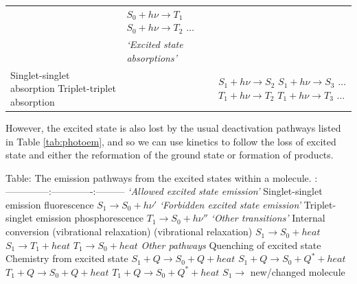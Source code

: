 \documentclass[
]{book}
\begin{document}
\begin{longtable}[]{@{}lll@{}}
\begin{minipage}[t]{0.33\columnwidth}
\strut
\end{minipage} & \begin{minipage}[t]{0.23\columnwidth}\raggedright
\(S_0 + h \nu \longrightarrow T_1\) \(S_0 + h \nu \longrightarrow T_2\) \(\dots\)\strut
\end{minipage}\tabularnewline
\begin{minipage}[t]{0.35\columnwidth}\raggedright
\strut
\end{minipage} & \begin{minipage}[t]{0.33\columnwidth}\raggedright
\emph{`Excited state absorptions'}\strut
\end{minipage} & \begin{minipage}[t]{0.23\columnwidth}\raggedright
\strut
\end{minipage}\tabularnewline
\begin{minipage}[t]{0.35\columnwidth}\raggedright
Singlet-singlet absorption Triplet-triplet absorption\strut
\end{minipage} & \begin{minipage}[t]{0.33\columnwidth}\raggedright
\strut
\end{minipage} & \begin{minipage}[t]{0.23\columnwidth}\raggedright
\(S_1 + h \nu \longrightarrow S_2\) \(S_1 + h \nu \longrightarrow S_3\) \(\dots\)\(T_1 + h \nu \longrightarrow T_2\) \(T_1 + h \nu \longrightarrow T_3\) \(\dots\)\strut
\end{minipage}\tabularnewline
\bottomrule
\end{longtable}

However, the excited state is also lost by the usual deactivation pathways listed in Table \ref{tab:photoem}, and so we can use kinetics to follow the loss of excited state and either the reformation of the ground state or formation of products.

Table: \label{tab:phototrans} The emission pathways from the excited states within a molecule.
\textbar{} \textbar{} \textbar{} \textbar{}
\textbar:--------------\textbar:-------------\textbar:---------\textbar{}
\textbar{}\emph{`Allowed excited state emission'} \textbar{} \textbar{} \textbar{}
\textbar{} Singlet-singlet emission\textbar{} fluorescence \textbar{} \(S_1 \longrightarrow S_0 + h \nu '\)\textbar{}
\textbar{}\emph{`Forbidden excited state emission'}\textbar\textbar\textbar{}
\textbar{} Triplet-singlet emission \textbar{} phosphorescence \textbar{}\(T_1 \longrightarrow S_0 + h \nu ''\)\textbar{}
\textbar{}\emph{`Other transitions'} \textbar{} \textbar{} \textbar{}
\textbar Internal conversion \textbar{} (vibrational relaxation) (vibrational relaxation) \textbar{} \(S_1 \longrightarrow S_0 + heat\) \(S_1 \longrightarrow T_1 + heat\) \(T_1 \longrightarrow S_0 + heat\)\textbar{}
\textbar{}\emph{Other pathways}\textbar{} \textbar{} \textbar{}
Quenching of excited state Chemistry from excited state\textbar{} \textbar{} \(S_1 + Q \longrightarrow S_0 + Q +heat\) \(S_1 + Q \longrightarrow S_0 + Q^\ast +heat\) \(T_1 + Q \longrightarrow S_0 + Q +heat\) \(T_1 + Q \longrightarrow S_0 + Q^\ast +heat\) \(S_1 \longrightarrow\) new/changed molecule \textbar{}
\end{document}
